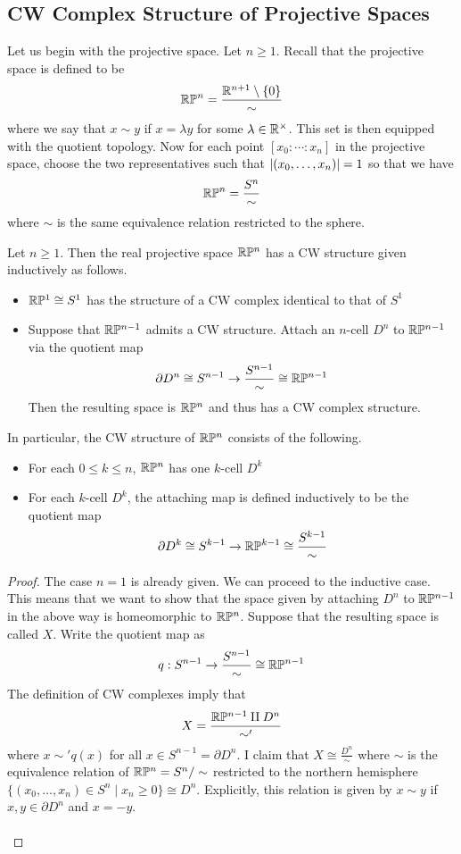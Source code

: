 \documentclass[a4paper]{article}
\begin{document}
\subsection{CW Complex Structure of Projective Spaces}
Let us begin with the projective space. Let $n\geq 1$. Recall that the projective space is defined to be $$\mathbb{R}\mathbb{P}^n=\frac{\mathbb{R}^{n+1}\setminus\{0\}}{\sim}$$ where we say that $x\sim y$ if $x=\lambda y$ for some $\lambda\in\mathbb{R}^\times$. This set is then equipped with the quotient topology. Now for each point $[x_0:\cdots:x_n]$ in the projective space, choose the two representatives such that $\abs{(x_0,\dots,x_n)}=1$ so that we have $$\mathbb{R}\mathbb{P}^n=\frac{S^n}{\sim}$$ where $\sim$ is the same equivalence relation restricted to the sphere. 

\begin{prp}{}{} Let $n\geq 1$. Then the real projective space $\mathbb{R}\mathbb{P}^n$ has a CW structure given inductively as follows. 
\begin{itemize}
\item $\mathbb{R}\mathbb{P}^1\cong S^1$ has the structure of a CW complex identical to that of $S^1$
\item Suppose that $\mathbb{R}\mathbb{P}^{n-1}$ admits a CW structure. Attach an $n$-cell $D^n$ to $\mathbb{R}\mathbb{P}^{n-1}$ via the quotient map $$\partial D^n\cong S^{n-1}\to\frac{S^{n-1}}{\sim}\cong\mathbb{R}\mathbb{P}^{n-1}$$ Then the resulting space is $\mathbb{R}\mathbb{P}^n$ and thus has a CW complex structure. 
\end{itemize}
In particular, the CW structure of $\mathbb{R}\mathbb{P}^n$ consists of the following. 
\begin{itemize}
\item For each $0\leq k\leq n$, $\mathbb{R}\mathbb{P}^n$ has one $k$-cell $D^k$
\item For each $k$-cell $D^k$, the attaching map is defined inductively to be the quotient map $$\partial D^k\cong S^{k-1}\to\mathbb{R}\mathbb{P}^{k-1}\cong\frac{S^{k-1}}{\sim}$$
\end{itemize} \tcbline
\begin{proof}
The case $n=1$ is already given. We can proceed to the inductive case. This means that we want to show that the space given by attaching $D^n$ to $\mathbb{R}\mathbb{P}^{n-1}$ in the above way is homeomorphic to $\mathbb{R}\mathbb{P}^n$. Suppose that the resulting space is called $X$. Write the quotient map as $$q:S^{n-1}\to\frac{S^{n-1}}{\sim}\cong\mathbb{R}\mathbb{P}^{n-1}$$ The definition of CW complexes imply that $$X=\frac{\mathbb{R}\mathbb{P}^{n-1}\amalg D^n}{\sim'}$$ where $x\sim' q(x)$ for all $x\in S^{n-1}=\partial D^n$. I claim that $X\cong\frac{D^n}{\sim}$ where $\sim$ is the equivalence relation of $\mathbb{R}\mathbb{P}^n=S^n/\sim$ restricted to the northern hemisphere $\{(x_0,\dots,x_n)\in S^n\;|\;x_n\geq 0\}\cong D^n$. Explicitly, this relation is given by $x\sim y$ if $x,y\in\partial D^n$ and $x=-y$. \\~\\

\end{proof}
\end{prp}
\end{document}

